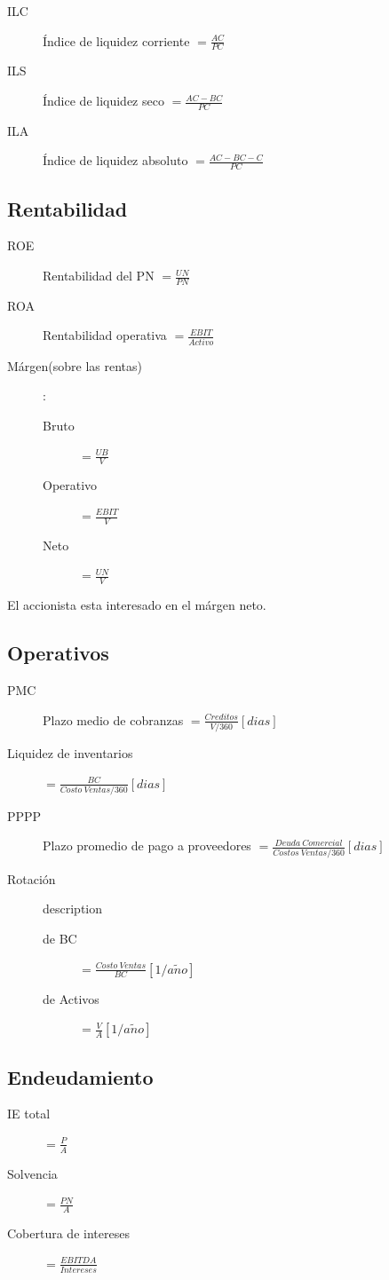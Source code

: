 \documentclass[twocolumn,10pt]{article}
\begin{document}
\begin{description}
	\item[ILC] Índice de liquidez corriente $=\frac{AC}{PC}$
	\item[ILS] Índice de liquidez seco $=\frac{AC-BC}{PC}$
	\item[ILA] Índice de liquidez absoluto $=\frac{AC-BC-C}{PC}$
\end{description}

\subsection{Rentabilidad}
\begin{description}
	\item[ROE] Rentabilidad del PN $=\frac{UN}{PN}$
	\item[ROA] Rentabilidad operativa $=\frac{EBIT}{Activo}$
	\item[Márgen(sobre las rentas)]:
	\begingroup
	\small
	\begin{description}
		\item[Bruto] $=\frac{UB}{V}$
		\item[Operativo] $=\frac{EBIT}{V}$
		\item[Neto] $=\frac{UN}{V}$
	\end{description}
	\endgroup
\end{description}
El accionista esta interesado en el márgen neto. 
\subsection{Operativos}
\begin{description}
	\item[PMC] Plazo medio de cobranzas $=\frac{Creditos}{V/360}[dias]$
	\item[Liquidez de inventarios]  $=\frac{BC}{Costo~Ventas/360} [dias]$
	\item[PPPP] Plazo promedio de pago a proveedores $=\frac{Deuda~Comercial}{Costos~Ventas/360}[dias]$ 
	\item[Rotación] description
	\begingroup
	\small
	\begin{description}
		\item[de BC] $=\frac{Costo~Ventas}{BC}[1/a\tilde{n}o]$
		\item[de Activos] $=\frac{V}{A}[1/a\tilde{n}o]$
	\end{description}
	\endgroup
\end{description}

\subsection{Endeudamiento}
\begin{description}
	\item[IE total] $=\frac{P}{A}$
	\item[Solvencia] $=\frac{PN}{A}$
	\item[Cobertura de intereses] $=\frac{EBITDA}{Intereses}$
\end{description}
\end{document}
